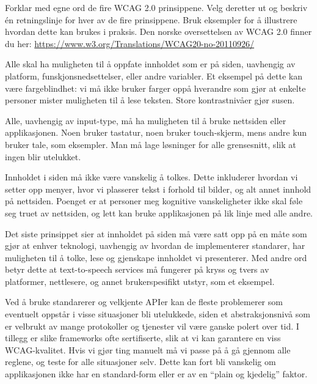 \documentclass{../../myassignment}
\begin{document}
	\begin{problem}
		Forklar med egne ord de fire WCAG 2.0 prinsippene. Velg deretter ut og beskriv én retningslinje for hver av de fire prinsippene. Bruk eksempler for å illustrere hvordan dette kan brukes i praksis. Den norske oversettelsen av WCAG 2.0 finner du her: \url{https://www.w3.org/Translations/WCAG20-no-20110926/}
	\end{problem}
	\begin{answer}
		\begin{description}[style=nextline]
			\item [Persepsjon] Alle skal ha muligheten til å oppfate innholdet som er på siden, uavhengig av platform, funskjonsnedsettelser, eller andre variabler. Et eksempel på dette kan være fargeblindhet: vi må ikke bruker farger oppå hverandre som gjør at enkelte personer mister muligheten til å lese teksten. Store kontrastnivåer gjør susen.
			\item [Operasjon] Alle, uavhengig av input-type, må ha muligheten til å bruke nettsiden eller applikasjonen. Noen bruker tastatur, noen bruker touch-skjerm, mens andre kun bruker tale, som eksempler. Man må lage løsninger for alle grensesnitt, slik at ingen blir utelukket. 
			\item [Forståelig] Innholdet i siden må ikke være vanskelig å tolkes. Dette inkluderer hvordan vi setter opp menyer, hvor vi plasserer tekst i forhold til bilder, og alt annet innhold på nettsiden. Poenget er at personer meg kognitive vanskeligheter ikke skal føle seg truet av nettsiden, og lett kan bruke applikasjonen på lik linje med alle andre. 
			\item [Robust] Det siste prinsippet sier at innholdet på siden må være satt opp på en måte som gjør at enhver teknologi, uavhengig av hvordan de implementerer standarer, har muligheten til å tolke, lese og gjenskape innholdet vi presenterer. Med andre ord betyr dette at text-to-speech services må fungerer på kryss og tvers av platformer, nettlesere, og annet brukerspesifikt utstyr, som et eksempel. 
		\end{description}
		Ved å bruke standarerer og velkjente APIer kan de fleste problemerer som eventuelt oppstår i visse situasjoner bli utelukkede, siden et abstraksjonsnivå som er velbrukt av mange protokoller og tjenester vil være ganske polert over tid. I tillegg er slike frameworks ofte sertifiserte, slik at vi kan garantere en viss WCAG-kvalitet. Hvis vi gjør ting manuelt må vi passe på å gå gjennom alle reglene, og teste for alle situasjoner selv. Dette kan fort bli vanskelig om applikasjonen ikke har en standard-form eller er av en ``plain og kjedelig'' faktor.
		
	\end{answer}
\end{document}

